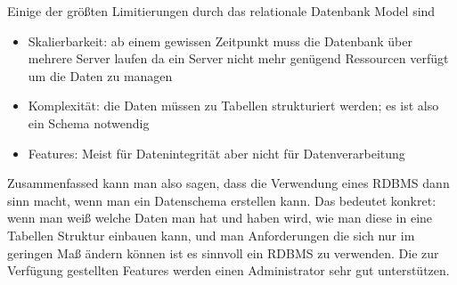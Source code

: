 Einige der größten Limitierungen \cite{MELD.CH2-relationaleDB.rdbmsBuch} durch das relationale Datenbank Model sind
\begin{itemize}
\item Skalierbarkeit: ab einem gewissen Zeitpunkt muss die Datenbank über mehrere Server laufen da ein Server nicht mehr genügend Ressourcen verfügt um die Daten zu managen
\item Komplexität: die Daten müssen zu Tabellen strukturiert werden; es ist also ein Schema notwendig
\item Features: Meist für Datenintegrität aber nicht für Datenverarbeitung 
\end{itemize}


Zusammenfassed kann man also sagen, dass die Verwendung eines RDBMS dann sinn macht, wenn man ein Datenschema erstellen kann. Das bedeutet konkret: wenn man weiß welche Daten man hat und haben wird, wie man diese in eine Tabellen Struktur einbauen kann, und man Anforderungen die sich nur im geringen Maß ändern können ist es sinnvoll ein RDBMS zu verwenden. Die zur Verfügung gestellten Features werden einen Administrator sehr gut unterstützen. 
